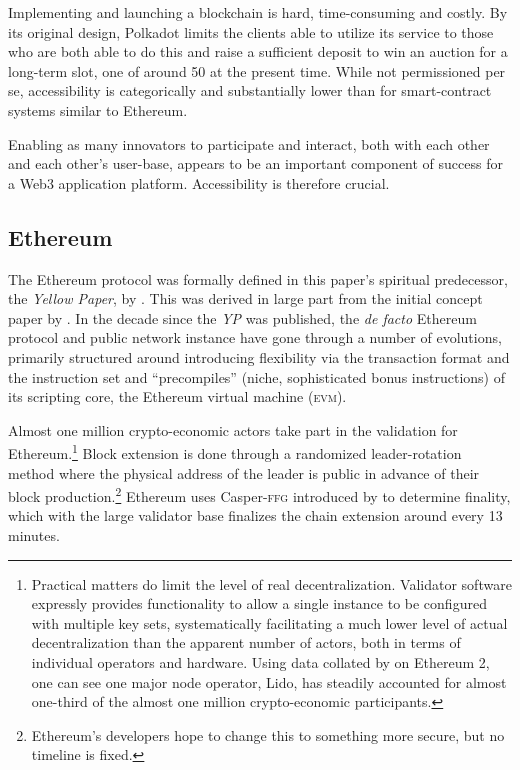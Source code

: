 Implementing and launching a blockchain is hard, time-consuming and costly. By its original design, Polkadot limits the clients able to utilize its service to those who are both able to do this and raise a sufficient deposit to win an auction for a long-term slot, one of around 50 at the present time. While not permissioned per se, accessibility is categorically and substantially lower than for smart-contract systems similar to Ethereum.

Enabling as many innovators to participate and interact, both with each other and each other's user-base, appears to be an important component of success for a Web3 application platform. Accessibility is therefore crucial.

\subsection{Ethereum}

The Ethereum protocol was formally defined in this paper's spiritual predecessor, the \emph{Yellow Paper}, by \cite{wood2014ethereum}. This was derived in large part from the initial concept paper by \cite{buterin2013ethereum}. In the decade since the \emph{YP} was published, the \emph{de facto} Ethereum protocol and public network instance have gone through a number of evolutions, primarily structured around introducing flexibility via the transaction format and the instruction set and ``precompiles'' (niche, sophisticated bonus instructions) of its scripting core, the Ethereum virtual machine (\textsc{evm}).

Almost one million crypto-economic actors take part in the validation for Ethereum.\footnote{Practical matters do limit the level of real decentralization. Validator software expressly provides functionality to allow a single instance to be configured with multiple key sets, systematically facilitating a much lower level of actual decentralization than the apparent number of actors, both in terms of individual operators and hardware. Using data collated by \cite{hildobby2024eth2} on Ethereum 2, one can see one major node operator, Lido, has steadily accounted for almost one-third of the almost one million crypto-economic participants.} Block extension is done through a randomized leader-rotation method where the physical address of the leader is public in advance of their block production.\footnote{Ethereum's developers hope to change this to something more secure, but no timeline is fixed.} Ethereum uses Casper-\textsc{ffg} introduced by \cite{buterin2019casper} to determine finality, which with the large validator base finalizes the chain extension around every 13 minutes.


